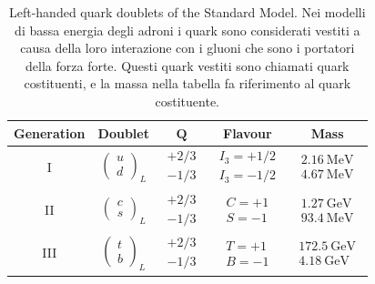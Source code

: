 \documentclass[11pt,a4paper,twoside,openright]{report}
\begin{document}
\begin{table}[htbp]
    \centering
    \begin{tabular*}{\textwidth}{@{\extracolsep{\fill}}ccccc@{}}
        \toprule
        \textbf{Generation} & \textbf{Doublet} & $\boldsymbol{Q}$ & \textbf{Flavour} & \textbf{Mass} \\
        \midrule
        I &
        $\begin{pmatrix} u \\ d \end{pmatrix}_L$ &
        $\begin{matrix} +2/3 \\ -1/3 \end{matrix}$ &
        $\begin{matrix} I_3 = +1/2 \\ I_3 = -1/2 \end{matrix}$ &
        $\begin{matrix} 2.16~\text{MeV} \\ 4.67~\text{MeV} \end{matrix}$ \\
        \midrule
        II &
        $\begin{pmatrix} c \\ s \end{pmatrix}_L$ &
        $\begin{matrix} +2/3 \\ -1/3 \end{matrix}$ &
        $\begin{matrix} C = +1 \\ S = -1 \end{matrix}$ &
        $\begin{matrix} 1.27~\text{GeV} \\ 93.4~\text{MeV} \end{matrix}$ \\
        \midrule
        III &
        $\begin{pmatrix} t \\ b \end{pmatrix}_L$ &
        $\begin{matrix} +2/3 \\ -1/3 \end{matrix}$ &
        $\begin{matrix} T = +1 \\ B = -1 \end{matrix}$ &
        $\begin{matrix} 172.5~\text{GeV} \\ 4.18~\text{GeV} \end{matrix}$ \\
        \bottomrule
    \end{tabular*}
    \caption{Left-handed quark doublets of the Standard Model.
 Nei modelli di bassa energia degli adroni i quark sono
    considerati vestiti a causa della loro interazione con i gluoni che sono i portatori
    della forza forte. Questi quark vestiti sono chiamati quark costituenti, e la massa nella tabella fa riferimento al quark costituente.}
    \label{tab:sm_quarks}
\end{table}
\end{document}
